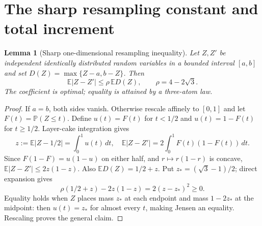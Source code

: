 \documentclass[11pt]{article}
\numberwithin{equation}{section}
\newtheorem{lemma}[theorem]{Lemma}
\theoremstyle{remark}
\newcommand{\E}{\mathbb E}
\newcommand{\Prb}{\mathbb P}
\begin{document}
\section{The sharp resampling constant and total increment}\label{sec:rho}
\begin{lemma}[Sharp one-dimensional resampling inequality]\label{lem:rho}
Let $Z,Z'$ be independent identically distributed random variables in a bounded interval $[a,b]$ and set $D(Z)=\max\{Z-a,b-Z\}$. Then
\begin{equation}\label{eq:rho}
 \E|Z-Z'|\le\rho\,\E D(Z),\qquad\rho=4-2\sqrt3.
\end{equation}
The coefficient is optimal; equality is attained by a three-atom law.
\end{lemma}
\begin{proof}
If $a=b$, both sides vanish. Otherwise rescale affinely to $[0,1]$ and let $F(t)=\Prb(Z\le t)$. Define $u(t)=F(t)$ for $t<1/2$ and $u(t)=1-F(t)$ for $t\ge1/2$. Layer-cake integration gives
\[
 z:=\E|Z-1/2|=\int_0^1u(t)\,dt,
 \quad\E|Z-Z'|=2\int_0^1F(t)(1-F(t))\,dt.
\]
Since $F(1-F)=u(1-u)$ on either half, and $r\mapsto r(1-r)$ is concave,
$\E|Z-Z'|\le2z(1-z)$. Also $\E D(Z)=1/2+z$. Put $z_*=(\sqrt3-1)/2$; direct expansion gives
\[
 \rho(1/2+z)-2z(1-z)=2(z-z_*)^2\ge0.
\]
Equality holds when $Z$ places mass $z_*$ at each endpoint and mass $1-2z_*$ at the midpoint: then $u(t)=z_*$ for almost every $t$, making Jensen an equality. Rescaling proves the general claim.
\end{proof}
\end{document}
